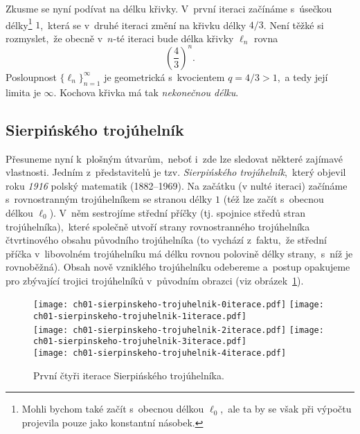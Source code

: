 Zkusme se nyní podívat na délku křivky. V~první iteraci začínáme s~úsečkou délky\footnote{Mohli bychom také začít s~obecnou délkou $\ell_0$,~ale ta by se však při výpočtu projevila pouze jako konstantní násobek.} $1$,~která se v~druhé iteraci změní na křivku délky $4/3$. Není těžké si rozmyslet,~že obecně v~$n$-té iteraci bude délka křivky $\ell_n$ rovna
\begin{equation*}
    \left(\dfrac{4}{3}\right)^{n}.
\end{equation*}
Posloupnost $\{\ell_n\}_{n=1}^{\infty}$ je geometrická s~kvocientem $q=4/3>1$,~a tedy její limita je $\infty$. Kochova křivka má tak \emph{nekonečnou délku}.

\subsection{Sierpińského trojúhelník}\label{subsec:sierpinskeho_trojuhelnik}
Přesuneme nyní k~plošným útvarům,~neboť i~zde lze sledovat některé zajímavé vlastnosti. Jedním z~představitelů je tzv. \emph{Sierpińského trojúhelník},~který objevil roku \emph{1916} polský matematik  \mbox{(1882--1969)}. \citep[str. 61]{Peitgen2004} Na začátku (v nulté iteraci) začínáme s~rovnostranným trojúhelníkem se stranou délky $1$ (též lze začít s~obecnou délkou $\ell_0$). V~něm sestrojíme střední příčky (tj. spojnice středů stran trojúhelníka),~které společně utvoří strany rovnostranného trojúhelníka čtvrtinového obsahu původního trojúhelníka (to vychází z~faktu,~že střední příčka v~libovolném trojúhelníku má délku rovnou polovině délky strany,~s~níž je rovnoběžná). Obsah nově vzniklého trojúhelníku odebereme a~postup opakujeme pro zbývající trojici trojúhelníků v~původním obrazci (viz obrázek~\ref{fig:sierpinskeho-trojuhelnik-5iteraci}).\par
\begin{figure}[h]
    \centering
    \texttt{[image: ch01-sierpinskeho-trojuhelnik-0iterace.pdf]}\qquad
    \texttt{[image: ch01-sierpinskeho-trojuhelnik-1iterace.pdf]}\qquad\\
    \texttt{[image: ch01-sierpinskeho-trojuhelnik-2iterace.pdf]}\qquad
    \texttt{[image: ch01-sierpinskeho-trojuhelnik-3iterace.pdf]}\qquad\\
    \texttt{[image: ch01-sierpinskeho-trojuhelnik-4iterace.pdf]}
    \caption{První čtyři iterace Sierpińského trojúhelníka.}
    \label{fig:sierpinskeho-trojuhelnik-5iteraci}
\end{figure}
